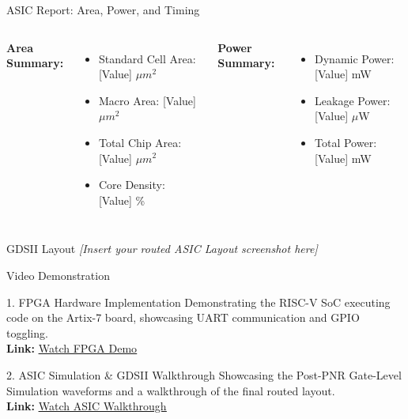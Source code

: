 \documentclass[10pt]{beamer}
\begin{document}
\begin{frame}{ASIC Report: Area, Power, and Timing}
    \begin{columns}
        \textbf{Area Summary:}
        \begin{itemize}
            \item Standard Cell Area: [Value] $\mu m^2$
            \item Macro Area: [Value] $\mu m^2$
            \item Total Chip Area: [Value] $\mu m^2$
            \item Core Density: [Value] \%
        \end{itemize}
        
        \textbf{Power Summary:}
        \begin{itemize}
            \item Dynamic Power: [Value] mW
            \item Leakage Power: [Value] $\mu$W
            \item Total Power: [Value] mW
        \end{itemize}
    \end{columns}
    
    \vspace{1em}
    \begin{block}{GDSII Layout}
        \centering
        \textit{[Insert your routed ASIC Layout screenshot here]}
    \end{block}
\end{frame}

\begin{frame}{Video Demonstration}
    \begin{block}{1. FPGA Hardware Implementation}
        Demonstrating the RISC-V SoC executing code on the Artix-7 board, showcasing UART communication and GPIO toggling. \\
        \vspace{0.5em}
        \textbf{Link:} \href{https://youtube.com/yourlink}{\underline{Watch FPGA Demo}}
    \end{block}
    
    \vspace{1em}
    \begin{block}{2. ASIC Simulation \& GDSII Walkthrough}
        Showcasing the Post-PNR Gate-Level Simulation waveforms and a walkthrough of the final routed layout. \\
        \vspace{0.5em}
        \textbf{Link:} \href{https://youtube.com/yourlink}{\underline{Watch ASIC Walkthrough}}
    \end{block}
\end{frame}
\end{document}

